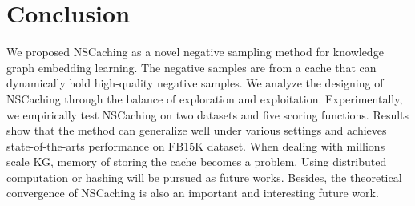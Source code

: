 \documentclass[conference]{IEEEtran}
\begin{document}
\section{Conclusion}
\label{sec:conclude}

We proposed NSCaching as a novel negative sampling method for knowledge graph embedding learning. 
The negative samples are from a cache that can dynamically hold high-quality negative samples. 
We analyze the designing of NSCaching through the balance of exploration and exploitation. 
Experimentally, we empirically test NSCaching on two datasets and five scoring functions. 
Results show that the method can generalize well under various settings and achieves state-of-the-arts performance on FB15K dataset.
When dealing with millions scale KG, memory of storing the cache becomes a problem. 
Using distributed computation or hashing will be pursued as future works. 
{Besides,
	the theoretical convergence of NSCaching is also an important and interesting future work.}











\end{document}
